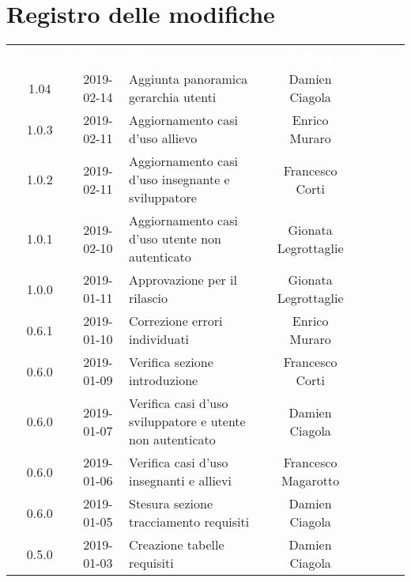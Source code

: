\section*{Registro delle modifiche}
{
	\renewcommand{\arraystretch}{1.5}
	\centering
	\begin{longtable}{ c c C{6cm} c c }
		\textcolor{white}{\textbf{Versione}} & \textcolor{white}{\textbf{Data}} & \textcolor{white}{\textbf{Descrizione}} & \textcolor{white}{\textbf{Autore}} & \textcolor{white}{\textbf{Ruolo}}\\
		
		1.04 &
		2019-02-14 &
		Aggiunta panoramica gerarchia utenti&
		Damien Ciagola&
		\reda{} \\
		
		1.0.3 &
		2019-02-11 &
		Aggiornamento casi d'uso allievo&
		Enrico Muraro&
		\reda{} \\
		
		1.0.2 &
		2019-02-11 &
		Aggiornamento casi d'uso insegnante e sviluppatore&
		Francesco Corti&
		\reda{} \\

		1.0.1 &
		2019-02-10 &
		Aggiornamento casi d'uso utente non autenticato&
		Gionata Legrottaglie&
		\reda{} \\

		1.0.0 &
		2019-01-11 &
		Approvazione per il rilascio &	
		Gionata Legrottaglie&	
		\Res{} \\
		
		0.6.1 & 
		2019-01-10 &  
		Correzione errori individuati &	
		Enrico Muraro&	
		\reda{} \\
		
		0.6.0 & 
		2019-01-09 &  
		Verifica sezione introduzione &	
		Francesco Corti&	
		\ver{} \\
		
		0.6.0 & 
		2019-01-07 &  
		Verifica casi d'uso sviluppatore e utente non autenticato& 	
		Damien Ciagola  &	
		\ver{} \\
		
		0.6.0 & 
		2019-01-06 &  
		Verifica casi d'uso insegnanti e allievi & 
		Francesco Magarotto  &
		\ver{}  \\
		
		0.6.0 & 
		2019-01-05 &  
		Stesura sezione tracciamento requisiti &	
		Damien Ciagola &	
		\reda{} \\
		
		0.5.0 & 
		2019-01-03 &  
		Creazione tabelle requisiti&	
		Damien Ciagola &	
		\reda{} \\
		

\end{longtable}}
